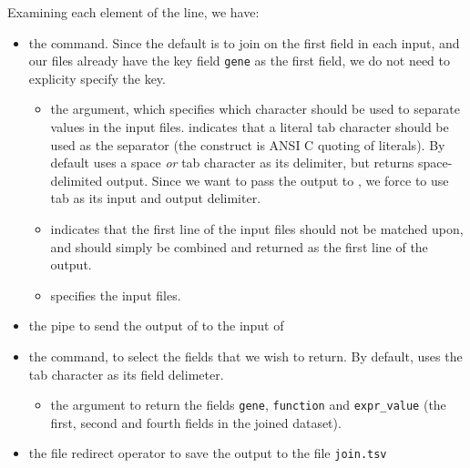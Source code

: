 \documentclass{article}
\begin{document}

Examining each element of the line, we have:

\begin{itemize}
    \item the  command. Since the default is to join on the first field in each input, and our files already have the key field \texttt{gene} as the first field, we do not need to explicity specify the key.
    \begin{itemize}
        \item the  argument, which specifies which character should be used to separate values in the input files.  indicates that a literal tab character should be used as the separator (the  construct is ANSI C quoting of literals). By default  uses a space \textit{or} tab character as its delimiter, but returns space-delimited output. Since we want to pass the output to , we force  to use tab as its input and output delimiter.
        \item {} indicates that the first line of the input files should not be matched upon, and should simply be combined and returned as the first line of the output.
        \item {} specifies the input files.
    \end{itemize}
    \item the pipe \bashsnippet{|} to send the output of  to the input of 
    \item the  command, to select the fields that we wish to return. By default,  uses the tab character as its field delimeter.
    \begin{itemize}
        \item the  argument to return the fields \texttt{gene}, \texttt{function} and \texttt{expr\_value} (the first, second and fourth fields in the joined dataset).
    \end{itemize}
    \item the file redirect operator \bashsnippet{>} to save the output to the file \texttt{join.tsv}
\end{itemize}
\end{document}
